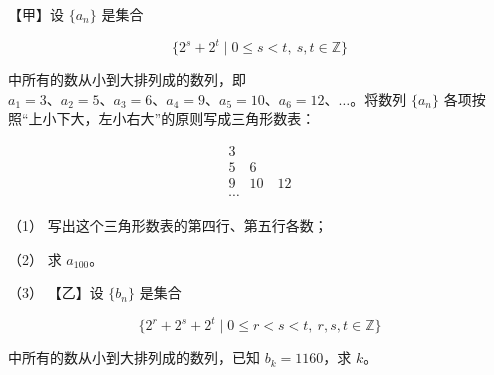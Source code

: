 \begin{question}
【甲】设 $\{a_n\}$ 是集合

\nopagebreak[4]
\[
\{2^s+2^t\mid 0\leqslant s<t,\ s,t\in\mathbb Z\}
\]

中所有的数从小到大排列成的数列，即 $a_1=3\text{、}a_2=5\text{、}a_3=6\text{、}a_4=9\text{、}a_5=10\text{、}a_6=12\text{、}\ldots$。将数列 $\{a_n\}$ 各项按照“上小下大，左小右大”的原则写成三角形数表：

\nopagebreak[4]
\[
\begin{array}{c}
3\\
5\quad6\\
9\quad10\quad12\\
\cdots
\end{array}
\]

（1） 写出这个三角形数表的第四行、第五行各数；

（2） 求 $a_{100}$。

（3） 【乙】设 $\{b_n\}$ 是集合

\nopagebreak[4]
\[
\{2^r+2^s+2^t\mid 0\leqslant r<s<t,\ r,s,t\in\mathbb Z\}
\]

中所有的数从小到大排列成的数列，已知 $b_k=1160$，求 $k$。

\end{question}